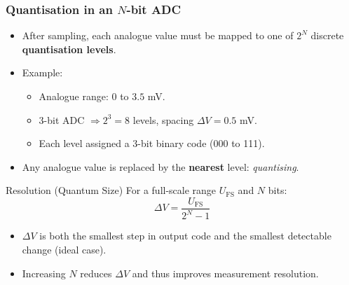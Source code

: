 \begin{frame}
	\frametitle{Quantisation in an $N$-bit ADC}
	\begin{itemize}
		\item After sampling, each analogue value must be mapped to one of $2^N$ discrete \textbf{quantisation levels}.
		\item Example:
		\begin{itemize}
			\item Analogue range: $0$ to $3.5$ mV.
			\item 3-bit ADC $\Rightarrow 2^3 = 8$ levels, spacing $\Delta V = 0.5$ mV.
			\item Each level assigned a 3-bit binary code (000 to 111).
		\end{itemize}
		\item Any analogue value is replaced by the \textbf{nearest} level: \emph{quantising}.
	\end{itemize}
	\begin{block}{Resolution (Quantum Size)}
		For a full-scale range $U_{\text{FS}}$ and $N$ bits:
		\begin{equation}
			\Delta V = \frac{U_{\text{FS}}}{2^N - 1}
		\end{equation}
		\vspace{-0.75cm}
		\begin{itemize}
			\item $\Delta V$ is both the smallest step in output code and the smallest detectable change (ideal case).
			\item Increasing $N$ reduces $\Delta V$ and thus improves measurement resolution.
		\end{itemize}
	\end{block}
\end{frame}

